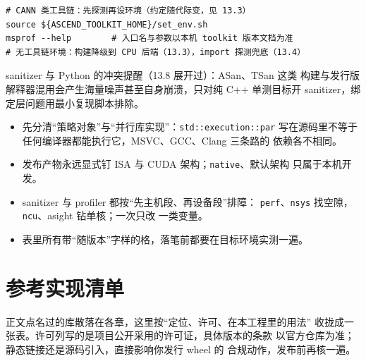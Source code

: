 \documentclass[12pt,a4paper,fontset=fandol]{ctexbook}
\newcommand{\Tp}[1]{\texttt{#1}}
\begin{document}
\begin{lstlisting}[style=shellstyle,caption={NPU 侧：路径探测与 profiler 入口}]
# CANN 类工具链：先探测再设环境（约定随代际变，见 13.3）
source ${ASCEND_TOOLKIT_HOME}/set_env.sh
msprof --help        # 入口名与参数以本机 toolkit 版本文档为准
# 无工具链环境：构建降级到 CPU 后端（13.3），import 探测兜底（13.4）
\end{lstlisting}

sanitizer 与 Python 的冲突提醒（13.8 展开过）：ASan、TSan 这类
构建与发行版解释器混用会产生海量噪声甚至自身崩溃，只对纯 C++
单测目标开 sanitizer，绑定层问题用最小复现脚本排除。

\begin{guideline}[title={矩阵使用要点}]
\begin{itemize}
\item 先分清``策略对象''与``并行库实现''：\Tp{std::execution::par}
写在源码里不等于任何编译器都能执行它，MSVC、GCC、Clang 三条路的
依赖各不相同。
\item 发布产物永远显式钉 ISA 与 CUDA 架构；\Tp{native}、默认架构
只属于本机开发。
\item sanitizer 与 profiler 都按``先主机段、再设备段''排障：
\Tp{perf}、\Tp{nsys} 找空隙，\Tp{ncu}、asight 钻单核；一次只改
一类变量。
\item 表里所有带``随版本''字样的格，落笔前都要在目标环境实测一遍。
\end{itemize}
\end{guideline}
\chapter{参考实现清单}

正文点名过的库散落在各章，这里按``定位、许可、在本工程里的用法''
收拢成一张表。许可列写的是项目公开采用的许可证，具体版本的条款
以官方仓库为准；静态链接还是源码引入，直接影响你发行 wheel 的
合规动作，发布前再核一遍。
\end{document}
